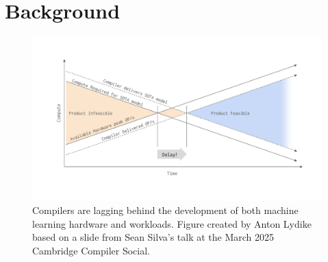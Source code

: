 \chapter{Background}
\label{chap:background}

%



\begin{figure}[H]
    \centering
    \includegraphics[width=\textwidth]{images/11_introduction/compilers_lagging.pdf}
    \caption{Compilers are lagging behind the development of both machine learning hardware and workloads. Figure created by Anton Lydike based on a slide from Sean Silva's talk at the March 2025 Cambridge Compiler Social.}
    \label{fig:compilers-lagging}
\end{figure}





